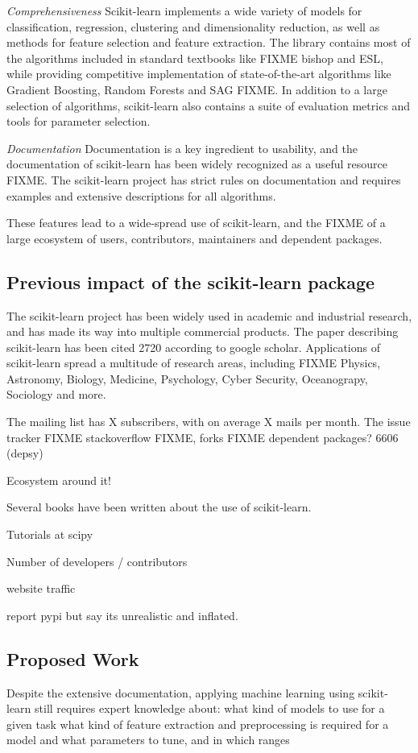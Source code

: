 \emph{Comprehensiveness} Scikit-learn implements a wide variety of models for classification,
regression, clustering and dimensionality reduction, as well as methods for feature
selection and feature extraction. The library contains most of the algorithms included
in standard textbooks like FIXME bishop and ESL, while providing competitive implementation
of state-of-the-art algorithms like Gradient Boosting, Random Forests and SAG FIXME\@.
In addition to a large selection of algorithms, scikit-learn also contains a suite
of evaluation metrics and tools for parameter selection.

\emph{Documentation}
Documentation is a key ingredient to usability, and the documentation of scikit-learn
has been widely recognized as a useful resource FIXME\@. The scikit-learn project
has strict rules on documentation and requires examples and extensive descriptions
for all algorithms.

These features lead to a wide-spread use of scikit-learn, and the FIXME of a large
ecosystem of users, contributors, maintainers and dependent packages.

\subsection{Previous impact of the scikit-learn package}
The scikit-learn project has been widely used in academic and industrial research,
and has made its way into multiple commercial products. The paper describing scikit-learn
has been cited 2720 according to google scholar. Applications of scikit-learn spread
a multitude of research areas, including FIXME Physics, Astronomy,
Biology, Medicine, Psychology, Cyber Security, Oceanograpy, Sociology and more.

The mailing list has X subscribers, with on average X mails per month.
The issue tracker FIXME stackoverflow FIXME, forks FIXME
dependent packages? 6606 (depsy)

Ecosystem around it!

Several books have been written about the use of scikit-learn.

Tutorials at scipy

Number of developers / contributors

website traffic

report pypi but say its unrealistic and inflated.

\subsection{Proposed Work}
Despite the extensive documentation, applying machine learning using scikit-learn
still requires expert knowledge about:
what kind of models to use for a given task
what kind of feature extraction and preprocessing is required for a model
and what parameters to tune, and in which ranges

